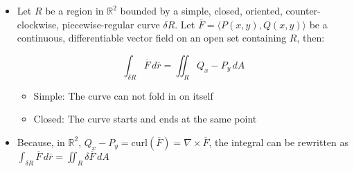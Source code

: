 \begin{itemize}
  \item Let $R$ be a region in $\mathbb{R}^2$ bounded by a simple, closed, oriented, counter-clockwise, piecewise-regular curve $\delta R$. Let $\overline{F}=\langle P(x,y), Q(x,y) \rangle$ be a continuous, differentiable vector field on an open set containing $R$, then:

    $$\int_{\delta R} \overline{F}\,d\overline{r}=\iint_R Q_x-P_y\,dA$$

    \begin{itemize}

      \item Simple: The curve can not fold in on itself

      \item Closed: The curve starts and ends at the same point

    \end{itemize}

  \item Because, in $\mathbb{R}^2$, $Q_x-P_y=\text{curl}(\overline{F})=\nabla \times \overline{F}$, the integral can be rewritten as $\displaystyle \int_{\delta R}\overline{F}\,d\overline{r}=\iint_R\delta\overline{F}\,dA$

\end{itemize}



